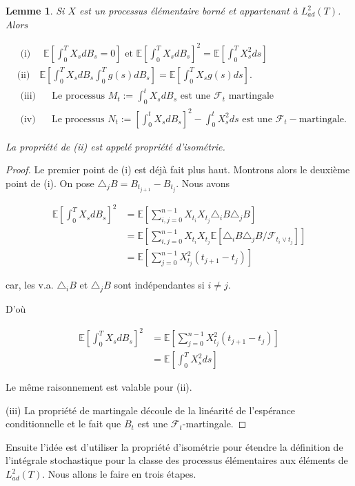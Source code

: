 \documentclass[A4paper,12pt]{report}
\newtheorem{lemma}{Lemme}[chapter]
\newcommand{\E}{{\mathbb{E}}}
\begin{document}
\begin{lemma}\label{lem2} Si $X$ est un processus élémentaire borné et appartenant à $L_{a d}^{2}(T)$. Alors

$$
\begin{aligned}
& \text { (i) } \quad \E \left[\int_{0}^{T} X_s d B_{s}=0\right] \text { et } \E\left[\int_{0}^{T} X_s d B_{s}\right]^{2}= \E \left[ \int_{0}^{T} X_s ^{2} d s\right] \\
&\text {(ii)} \quad \E\left[\int_{0}^{T} X_s d B_{s} \int_{0}^{T} g(s) d B_{s}\right]=\E\left[ \int_{0}^{T} X_s g(s) d s\right] . \\
&\text { (iii) } \quad \text { Le processus } M_{t}:=\int_{0}^{t} X_s d B_{s} \text { est une } \mathcal{F}_{t} \text { martingale } \\
& \text { (iv) } \quad \text { Le processus } N_{t}:=\left[\int_{0}^{t} X_s d B_{s}\right]^{2}-\int_{0}^{t} X_s^{2} d s \text { est une } \mathcal{F}_{t}-\text {martingale. }
\end{aligned}
$$

La propriété de (ii) est appelé propriété d'isométrie.
\end{lemma}
\begin{proof}
Le premier point de (i) est déjà fait plus haut. Montrons alors le deuxième point de (i). On pose $\triangle_{j} B=B_{t_{j+1}}-B_{t_{j}}$. Nous avons

$$
\begin{aligned}
\E\left[\int_{0}^{T} X_s d B_{s}\right]^{2} & = \E\left[\sum_{i, j=0}^{n-1} X_{t_{i}} X_{t_{j}} \triangle_{i} B \triangle_{j} B\right] \\
& =\E\left[\sum_{i, j=0}^{n-1} X_{t_{i}} X_{t_{j}} \E\left[\triangle_{i} B \triangle_{j} B / \mathcal{F}_{t_{i} \vee t_{j}}\right]\right] \\
& =\E \left[ \sum_{j=0}^{n-1} X_{t_{j}} ^{2}\left(t_{j+1}-t_{j}\right) \right]
\end{aligned}
$$

car, les v.a. $\triangle_{i} B$ et $\triangle_{j} B$ sont indépendantes si $i \neq j$.

D'où

\begin{align*}
\E\left[\int_{0}^{T} X_s d B_{s}\right]^{2} &=\E \left[\sum_{j=0}^{n-1} X_{t_{j}} ^{2}\left(t_{j+1}-t_{j}\right)\right]\\
&=\E\left[ \int_{0}^{T}X_s^{2} d s\right]
\end{align*}



Le même raisonnement est valable pour (ii).

(iii) La propriété de martingale découle de la linéarité de l'espérance conditionnelle et le fait que $B_{t}$ est une $\mathcal{F}_{t}$-martingale.
\end{proof}
Ensuite l'idée est d'utiliser la propriété d'isométrie pour étendre la définition de l'intégrale stochastique pour la classe des processus élémentaires aux éléments de $L_{a d}^{2}(T)$. Nous allons le faire en trois étapes.
\end{document}
